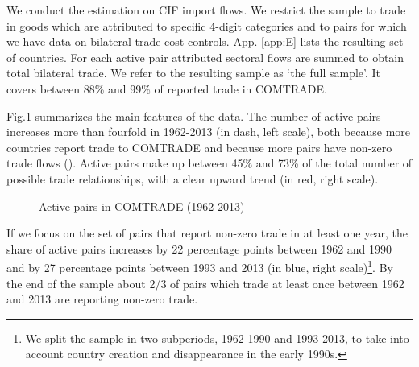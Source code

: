\documentclass[12pt,twoside,a4paper,notitlepage]{article}
\begin{document}
We conduct the estimation on CIF import flows.
We restrict the sample to trade in goods which are attributed to specific 4-digit categories and to pairs for which we have data on bilateral trade cost controls.
App.
\ref{app:E} lists the resulting set of countries.
For each active pair attributed sectoral flows are summed to obtain total bilateral trade.
We refer to the resulting sample as `the full sample'.
It covers between 88\% and 99\% of reported trade in COMTRADE.

Fig.\ref{fig:active_pairs} summarizes the main features of the data.
The number of active pairs increases more than fourfold in 1962-2013 (in dash, left scale), both because more countries report trade to COMTRADE and because more pairs have non-zero trade flows (\cite{Helpman2008}).
Active pairs make up between 45\% and 73\% of the total number of possible trade relationships, with a clear upward trend (in red, right scale).

\begin{figure}[h!]
\caption{Active pairs in COMTRADE (1962-2013) \label{fig:active_pairs}}
\begin{center}
\setlength{\fboxrule}{1pt} %
\setlength{\fboxsep}{.1in} %
\end{center}
\end{figure}

If we focus on the set of pairs that report non-zero trade in at least one year, the share of active pairs increases by 22 percentage points between 1962 and 1990 and by 27 percentage points between 1993 and 2013 (in blue, right scale)\footnote{We split the sample in two subperiods, 1962-1990 and 1993-2013, to take into account country creation and disappearance in the early 1990s.}.
By the end of the sample about 2/3 of pairs which trade at least once between 1962 and 2013 are reporting non-zero trade.
\end{document}
